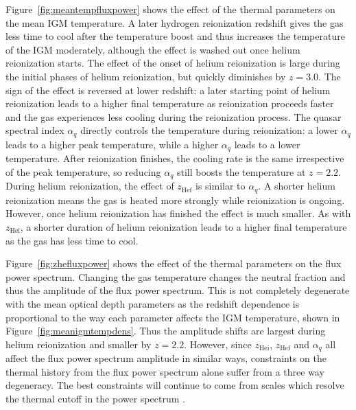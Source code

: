 \documentclass[a4paper,11pt]{article}
\begin{document}
Figure~\ref{fig:meantempfluxpower} shows the effect of the thermal parameters on the mean IGM temperature.
A later hydrogen reionization redshift gives the gas less time to cool after the temperature boost and thus increases the temperature of the IGM moderately, although the effect is washed out once helium reionization starts. The effect of the onset of helium reionization is large during the initial phases of helium reionization, but quickly diminishes by $z=3.0$. The sign of the effect is reversed at lower redshift: a later starting point of helium reionization leads to a higher final temperature as reionization proceeds faster and the gas experiences less cooling during the reionization process. The quasar spectral index $\alpha_q$ directly controls the temperature during reionization: a lower $\alpha_q$ leads to a higher peak temperature, while a higher $\alpha_q$ leads to a lower temperature. After reionization finishes, the cooling rate is the same irrespective of the peak temperature, so reducing $\alpha_q$ still boosts the temperature at $z=2.2$. During helium reionization, the effect of  $z_\mathrm{Hef}$ is similar to $\alpha_q$. A shorter helium reionization means the gas is heated more strongly while reionization is ongoing. However, once helium reionization has finished the effect is much smaller. As with $z_\mathrm{Hei}$, a shorter duration of helium reionization leads to a higher final temperature as the gas has less time to cool.

Figure~\ref{fig:zhefluxpower} shows the effect of the thermal parameters on the flux power spectrum. Changing the gas temperature changes the neutral fraction and thus the amplitude of the flux power spectrum. This is not completely degenerate with the mean optical depth parameters as the redshift dependence is proportional to the way each parameter affects the IGM temperature, shown in Figure~\ref{fig:meanigmtempdens}. Thus the amplitude shifts are largest during helium reionization and smaller by $z=2.2$. However, since $z_\mathrm{Hei}$, $z_\mathrm{Hef}$ and $\alpha_q$ all affect the flux power spectrum amplitude in similar ways, constraints on the thermal history from the flux power spectrum alone suffer from a three way degeneracy. The best constraints will continue to come from scales which resolve the thermal cutoff in the power spectrum \cite{Gaikwad:2021}.
\end{document}
